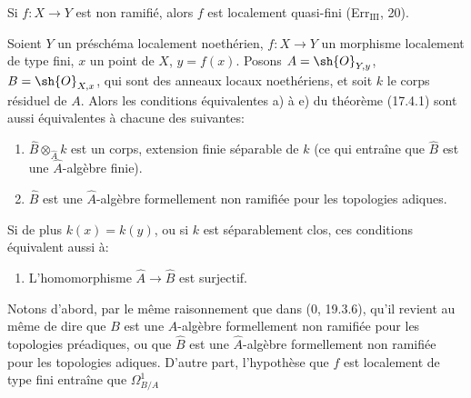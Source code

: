 \begin{corollary}[17.4.3]
\label{IV.17.4.3}
Si $f:X\to Y$ est non ramifié, alors $f$ est localement quasi-fini (Err$_{\mathrm{III}}$, 20).
\end{corollary}

\begin{proposition}[17.4.4]
\label{IV.17.4.4}
Soient $Y$ un préschéma localement noethérien, $f:X\to Y$ un morphisme localement de type fini, $x$ un point de $X$, $y=f(x)$. Posons $A=\sh{O}_{Y,y}$, $B=\sh{O}_{X,x}$, qui sont des anneaux locaux noethériens, et soit $k$ le corps résiduel de $A$. Alors les conditions équivalentes a) à e) du théorème (17.4.1) sont aussi équivalentes à chacune des suivantes:
\begin{enumerate}
  \item[f)] $\widehat{B}\otimes_{\widehat{A}}k$ est un corps, extension finie séparable de $k$ (ce qui entraîne que $\widehat{B}$ est une $\widehat{A}$-algèbre finie).
  \item[f')] $\widehat{B}$ est une $\widehat{A}$-algèbre formellement non ramifiée pour les topologies adiques.
\end{enumerate}
Si de plus $k(x)=k(y)$, ou si $k$ est séparablement clos, ces conditions équivalent aussi à:
\begin{enumerate}
  \item[f'')] L'homomorphisme $\widehat{A}\to\widehat{B}$ est surjectif.
\end{enumerate}
\end{proposition}

Notons d'abord, par le même raisonnement que dans (0, 19.3.6), qu'il revient au même de dire que $B$ est une $A$-algèbre formellement non ramifiée pour les topologies préadiques, ou que $\widehat{B}$ est une $\widehat{A}$-algèbre formellement non ramifiée pour les topologies adiques. D'autre part, l'hypothèse que $f$ est localement de type fini entraîne que $\Omega^1_{B/A}$

